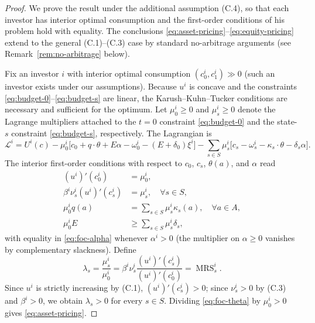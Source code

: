 \documentclass[11pt,a4paper,oneside]{book}
\def\geq{\geqslant}
\DeclareMathOperator{\MRS}{MRS}
\theoremstyle{plain}
\theoremstyle{definition}
\theoremstyle{remark}
\numberwithin{equation}{chapter}
\begin{document}
\begin{proof}
We prove the result under the additional assumption (C.4), so that each investor has interior optimal consumption and the first-order conditions of his problem hold with equality.
The conclusions \eqref{eq:asset-pricing}--\eqref{eq:equity-pricing} extend to the general (C.1)--(C.3) case by standard no-arbitrage arguments (see Remark~\ref{rem:no-arbitrage} below).

Fix an investor $i$ with interior optimal consumption $(c^i_0, c^i_1) \gg 0$ (such an investor exists under our assumptions).
Because $u^i$ is concave and the constraints \eqref{eq:budget-0}--\eqref{eq:budget-s} are linear, the Karush--Kuhn--Tucker conditions are necessary and sufficient for the optimum.
Let $\mu^i_0 \geq 0$ and $\mu^i_s \geq 0$ denote the Lagrange multipliers attached to the $t=0$ constraint \eqref{eq:budget-0} and the state-$s$ constraint \eqref{eq:budget-s}, respectively.
The Lagrangian is
\begin{equation*}
  \mathcal{L}^i = U^i(c) - \mu^i_0 \bigl[ c_0 + q \cdot \theta + E \alpha - \omega^i_0 - (E + \delta_0) \xi^i \bigr]
  - \sum_{s \in S} \mu^i_s \bigl[ c_s - \omega^i_s - \kappa_s \cdot \theta - \delta_s \alpha \bigr].
\end{equation*}
The interior first-order conditions with respect to $c_0$, $c_s$, $\theta(a)$, and $\alpha$ read
\begin{align}
  (u^i)'(c^i_0) &= \mu^i_0,
  \label{eq:foc-c0}\\
  \beta^i \nu^i_s (u^i)'(c^i_s) &= \mu^i_s,
  \quad \forall s \in S,
  \label{eq:foc-cs}\\
  \mu^i_0 q(a) &= \sum_{s \in S} \mu^i_s \kappa_s(a),
  \quad \forall a \in A,
  \label{eq:foc-theta}\\
  \mu^i_0 E &\geq \sum_{s \in S} \mu^i_s \delta_s,
  \label{eq:foc-alpha}
\end{align}
with equality in \eqref{eq:foc-alpha} whenever $\alpha^i > 0$ (the multiplier on $\alpha \geq 0$ vanishes by complementary slackness).
Define
\begin{equation}\label{eq:lambda-def}
  \lambda_s = \frac{\mu^i_s}{\mu^i_0} = \beta^i \nu^i_s \frac{(u^i)'(c^i_s)}{(u^i)'(c^i_0)} = \MRS^i_s.
\end{equation}
Since $u^i$ is strictly increasing by (C.1), $(u^i)'(c^i_s) > 0$; since $\nu^i_s > 0$ by (C.3) and $\beta^i > 0$, we obtain $\lambda_s > 0$ for every $s \in S$.
Dividing \eqref{eq:foc-theta} by $\mu^i_0 > 0$ gives \eqref{eq:asset-pricing}.


\end{proof}
\end{document}
